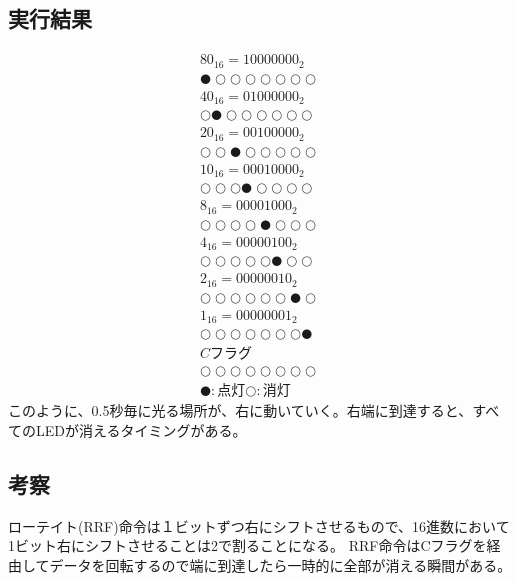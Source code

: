 \documentclass[a4paper,12pt]{ujarticle}
\begin{document}
  \subsection{実行結果}
  \begin{eqnarray*}
   {80}_{16} = 10000000_2 \\
   ●○○○○○○○ \\
   {40}_{16} = 01000000_2 \\
   ○●○○○○○○ \\
   {20}_{16} = 00100000_2 \\
   ○○●○○○○○ \\
   {10}_{16} = 00010000_2 \\
   ○○○●○○○○ \\
   {8}_{16}  = 00001000_2 \\
   ○○○○●○○○ \\
   {4}_{16}  = 00000100_2 \\
   ○○○○○●○○ \\
   {2}_{16}  = 00000010_2 \\
   ○○○○○○●○ \\
   {1}_{16}  = 00000001_2 \\
   ○○○○○○○● \\
   Cフラグ \\
   ○○○○○○○○ \\
   ●:点灯○:消灯
  \end{eqnarray*}
  このように、0.5秒毎に光る場所が、右に動いていく。右端に到達すると、すべてのLEDが消えるタイミングがある。
  \subsection{考察}
  ローテイト(RRF)命令は１ビットずつ右にシフトさせるもので、16進数において1ビット右にシフトさせることは2で割ることになる。
  RRF命令はCフラグを経由してデータを回転するので端に到達したら一時的に全部が消える瞬間がある。
\end{document}
